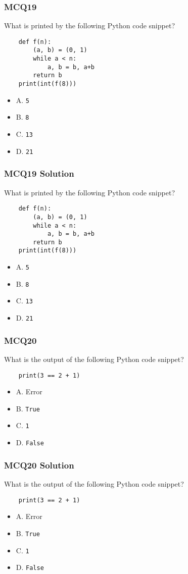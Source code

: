 \documentclass{beamer}
\begin{document}
\begin{frame}[fragile]
    \frametitle{MCQ19}
    What is printed by the following Python code snippet?
    \begin{verbatim}
    def f(n):
        (a, b) = (0, 1)
        while a < n:
            a, b = b, a+b
        return b
    print(int(f(8)))
    \end{verbatim}
    \begin{itemize}
        \item A. \texttt{5}
        \item B. \texttt{8}
        \item C. \texttt{13}
        \item D. \texttt{21}
    \end{itemize}
\end{frame}
\begin{frame}[fragile]
    \frametitle{MCQ19 Solution}
    What is printed by the following Python code snippet?
    \begin{verbatim}
    def f(n):
        (a, b) = (0, 1)
        while a < n:
            a, b = b, a+b
        return b
    print(int(f(8)))
    \end{verbatim}
    \begin{itemize}
        \item A. \texttt{5}
        \item B. \texttt{8}
        \item \alert{C. \texttt{13}}
        \item D. \texttt{21}
    \end{itemize}
\end{frame}

\begin{frame}[fragile]
    \frametitle{MCQ20}
    What is the output of the following Python code snippet?
    \begin{verbatim}
    print(3 == 2 + 1)
    \end{verbatim}
    \begin{itemize}
        \item A. Error
        \item B. \texttt{True}
        \item C. \texttt{1}
        \item D. \texttt{False}
    \end{itemize}
\end{frame}
\begin{frame}[fragile]
    \frametitle{MCQ20 Solution}
    What is the output of the following Python code snippet?
    \begin{verbatim}
    print(3 == 2 + 1)
    \end{verbatim}
    \begin{itemize}
        \item A. Error
        \item \alert{B. \texttt{True}}
        \item C. \texttt{1}
        \item D. \texttt{False}
    \end{itemize}
\end{frame}
\end{document}
